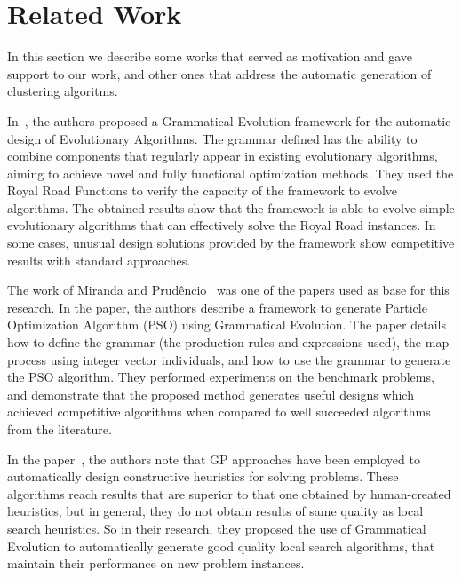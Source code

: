 \documentclass[conference,compsoc]{IEEEtran}
\begin{document}

\section{Related Work} \label{sec:related_work}

In this section we describe some works that served as motivation and gave support to our work, and other ones that address the automatic generation of clustering algoritms.  

In~\cite{lourencco2012evolving,lourencco2015IEEE}, the authors proposed a Grammatical Evolution framework for the automatic design of Evolutionary Algorithms. The grammar defined has the ability to combine components that regularly appear in existing evolutionary algorithms, aiming to achieve novel and fully functional optimization methods. They used the Royal Road Functions to verify the capacity of the framework to evolve algorithms. The obtained results show that the framework is able to evolve simple evolutionary algorithms that can effectively solve the Royal Road instances. In some cases, unusual design solutions provided by the framework show competitive results with standard approaches.

The work of Miranda and Prud\^encio~\cite{miranda2015gefpso} was one of the papers used as base for this research. In the paper, the authors describe a framework to generate Particle Optimization Algorithm (PSO) using Grammatical Evolution. The paper details how to define the grammar (the production rules and expressions used), the map process using integer vector individuals, and how to use the grammar to generate the PSO algorithm. They performed experiments on the benchmark problems, and demonstrate that the proposed method generates useful designs which achieved competitive algorithms when compared to well succeeded algorithms from the literature.

In the paper~\cite{burke2012grammatical}, the authors note that GP approaches have been employed to automatically design constructive heuristics for solving problems. These algorithms reach results that are superior to that one obtained by human-created heuristics, but in general, they do not obtain results of same quality as local search heuristics. So in their research, they proposed the use of Grammatical Evolution to automatically generate good quality local search algorithms, that maintain their performance on new problem instances.
\end{document}
